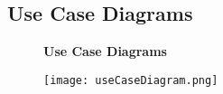 

\subsection{Use Case Diagrams}


\begin{figure}
    \centering
    \textbf{Use Case Diagrams}\par\medskip
    \texttt{[image: useCaseDiagram.png]}
\end{figure}